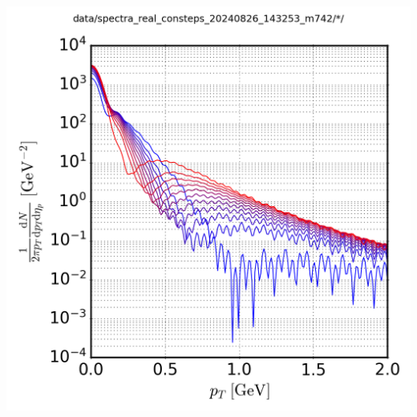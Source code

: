 {\begin{minipage}{\linewidth}
{\begin{minipage}{0.4\linewidth}
                \includegraphics[width=\linewidth]{code/C++/DCCspec/data/images/spectra_real_consteps_20240826_143253_m742_spec.png}        
            \end{minipage}
        }
        \label{fig:SpecRealConstEps_m742}
    \end{minipage}
}

